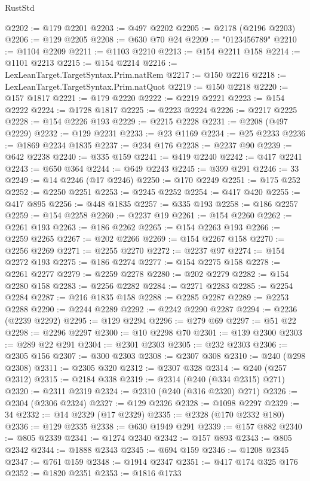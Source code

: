 \begin{lexlean}{RustStd}
\begin{coremodule}
@2202 := @179 @2201
@2203 := @497 @2202
@2205 := @2178 (@2196 @2203)
@2206 := @129 @2205
@2208 := @630 @70 @24
@2209 := "0123456789"
@2210 := @1104 @2209
@2211 := @1103 @2210
@2213 := @154 @2211 @158
@2214 := @1101 @2213
@2215 := @154 @2214
@2216 := LexLeanTarget.TargetSyntax.Prim.natRem
@2217 := @150 @2216
@2218 := LexLeanTarget.TargetSyntax.Prim.natQuot
@2219 := @150 @2218
@2220 := @157 @1817
@2221 := @179 @2220
@2222 := @2219 @2221
@2223 := @154 @2222
@2224 := @1728 @1817
@2225 := @2223 @2224
@2226 := @2217 @2225
@2228 := @154 @2226 @193
@2229 := @2215 @2228
@2231 := @2208 (@497 @2229)
@2232 := @129 @2231
@2233 := @23 @1169
@2234 := @25 @2233
@2236 := @1869 @2234 @1835
@2237 := @234 @176
@2238 := @2237 @90
@2239 := @642 @2238
@2240 := @335 @159
@2241 := @419 @2240
@2242 := @417 @2241
@2243 := @650 @364
@2244 := @649 @2243
@2245 := @399 @291
@2246 := 33
@2249 := @14 @2246 (@17 @2246)
@2250 := @170 @2249
@2251 := @175 @252
@2252 := @2250 @2251
@2253 := @2245 @2252
@2254 := @417 @420
@2255 := @417 @895
@2256 := @448 @1835
@2257 := @335 @193
@2258 := @186 @2257
@2259 := @154 @2258
@2260 := @2237 @19
@2261 := @154 @2260
@2262 := @2261 @193
@2263 := @186 @2262
@2265 := @154 @2263 @193
@2266 := @2259 @2265
@2267 := @202 @2266
@2269 := @154 @2267 @158
@2270 := @2256 @2269
@2271 := @2255 @2270
@2272 := @2237 @97
@2274 := @154 @2272 @193
@2275 := @186 @2274
@2277 := @154 @2275 @158
@2278 := @2261 @2277
@2279 := @2259 @2278
@2280 := @202 @2279
@2282 := @154 @2280 @158
@2283 := @2256 @2282
@2284 := @2271 @2283
@2285 := @2254 @2284
@2287 := @216 @1835 @158
@2288 := @2285 @2287
@2289 := @2253 @2288
@2290 := @2244 @2289
@2292 := @2242 @2290 @2287
@2294 := @2236 (@2239 @2292)
@2295 := @129 @2294
@2296 := @279 @69
@2297 := @51 @22
@2298 := @2296 @2297
@2300 := @10 @2298 @70
@2301 := @139 @2300
@2303 := @289 @22 @291
@2304 := @2301 @2303
@2305 := @232 @2303
@2306 := @2305 @156
@2307 := @300 @2303
@2308 := @2307 @308
@2310 := @240 (@298 @2308)
@2311 := @2305 @320
@2312 := @2307 @328
@2314 := @240 (@257 @2312)
@2315 := @2184 @338
@2319 := @2314 (@240 (@334 @2315) @271)
@2320 := @2311 @2319
@2324 := @2310 (@240 (@316 @2320) @271)
@2326 := @2304 (@2306 @2324)
@2327 := @129 @2326
@2328 := @1098 @2297
@2329 := 34
@2332 := @14 @2329 (@17 @2329)
@2335 := @2328 (@170 @2332 @180)
@2336 := @129 @2335
@2338 := @630 @1949 @291
@2339 := @157 @882
@2340 := @805 @2339
@2341 := @1274 @2340
@2342 := @157 @893
@2343 := @805 @2342
@2344 := @1888 @2343
@2345 := @694 @159
@2346 := @1208 @2345
@2347 := @761 @159
@2348 := @1914 @2347
@2351 := @417 @174 @325 @176
@2352 := @1820 @2351
@2353 := @1816 @1733

\end{coremodule}
\end{lexlean}
